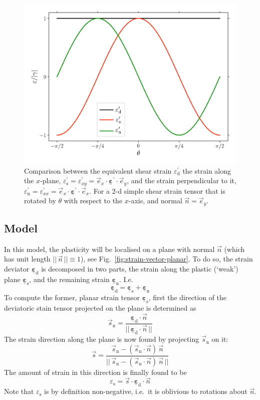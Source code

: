 \documentclass[times,namecite]{goose-article}
\newcommand\T[1]{\underline{\bm{{#1}}}}
\begin{document}
\begin{figure}[htp]
  \centering
  \includegraphics[width=.5\textwidth]{figures/strain-modes_2d_epseq}
  \caption{Comparison between the equivalent shear strain $\varepsilon_\mathrm{d}^\prime$ the strain along the $x$-plane, $\varepsilon_\mathrm{s}^\prime = \varepsilon_{xy}^\prime = \vec{e}_x \cdot \T{\varepsilon}^\prime \cdot \vec{e}_y$, and the strain perpendicular to it, $\varepsilon_\mathrm{n}^\prime = \varepsilon_{xx}^\prime = \vec{e}_x \cdot \T{\varepsilon}^\prime \cdot \vec{e}_x$. For a 2-d simple shear strain tensor that is rotated by $\theta$ with respect to the $x$-axis, and normal $\vec{n} = \vec{e}_y$.}
  \label{fig:shear-modes:epseq}
\end{figure}

\subsection{Model}

In this model, the plasticity will be localised on a plane with normal $\vec{n}$ (which has unit length $||\, \vec{n} \,|| \equiv 1$), see Fig.~\ref{fig:strain-vector-planar}. To do so, the strain deviator $\T{\varepsilon}_\mathrm{d}$ is decomposed in two parts, the strain along the plastic (`weak') plane $\T{\varepsilon}_\mathrm{s}$, and the remaining strain $\T{\varepsilon}_\mathrm{n}$. I.e.
\begin{equation}\label{eq:planar:strain:decomposition}
  \T{\varepsilon}_\mathrm{d} = \T{\varepsilon}_\mathrm{s} + \T{\varepsilon}_\mathrm{n}
\end{equation}
To compute the former, planar strain tensor $\T{\varepsilon}_\mathrm{s}$, first the direction of the deviatoric stain tensor projected on the plane is determined as
\begin{equation}
  \vec{s}_\mathrm{n} =
  \frac{
    \T{\varepsilon}_\mathrm{d} \cdot \vec{n}
  }
  {
    ||\, \T{\varepsilon}_\mathrm{d} \cdot \vec{n} \,||
  }
\end{equation}
The strain direction along the plane is now found by projecting $\vec{s}_\mathrm{n}$ on it:
\begin{equation}
  \vec{s} =
  \frac{
    \vec{s}_\mathrm{n} - ( \vec{s}_\mathrm{n} \cdot \vec{n} )\, \vec{n}
  }
  {
    ||\, \vec{s}_\mathrm{n} - ( \vec{s}_\mathrm{n} \cdot \vec{n} )\, \vec{n} \,||
  }
\end{equation}
The amount of strain in this direction is finally found to be
\begin{equation}
  \varepsilon_\mathrm{s} = \vec{s} \cdot \T{\varepsilon}_\mathrm{d} \cdot \vec{n}
\end{equation}
Note that $\varepsilon_\mathrm{s}$ is by definition non-negative, i.e.\ it is oblivious to rotations about $\vec{n}$.
\end{document}
